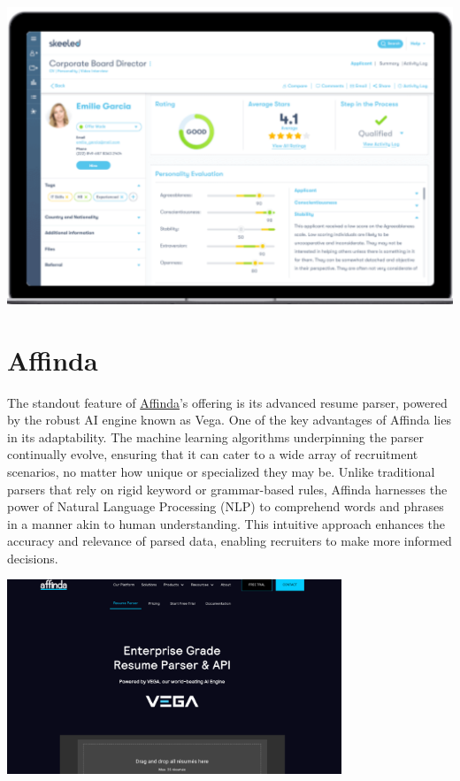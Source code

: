 \documentclass[
]{book}
\begin{document}
\includegraphics[width=5.30208in,height=\textheight]{skeeled pic.png}

\hypertarget{affinda}{%
\section{Affinda}\label{affinda}}

The standout feature of \href{https://www.affinda.com/resume-parser}{Affinda}'s offering is its advanced resume parser, powered by the robust AI engine known as Vega. One of the key advantages of Affinda lies in its adaptability. The machine learning algorithms underpinning the parser continually evolve, ensuring that it can cater to a wide array of recruitment scenarios, no matter how unique or specialized they may be. Unlike traditional parsers that rely on rigid keyword or grammar-based rules, Affinda harnesses the power of Natural Language Processing (NLP) to comprehend words and phrases in a manner akin to human understanding. This intuitive approach enhances the accuracy and relevance of parsed data, enabling recruiters to make more informed decisions.

\includegraphics[width=3.9375in,height=\textheight]{affinda pic.png}
\end{document}
